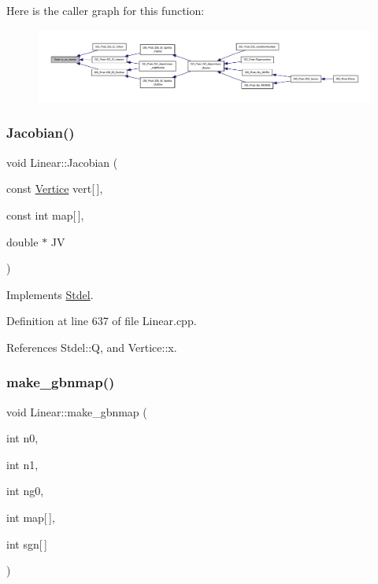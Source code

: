Here is the caller graph for this function\+:
\nopagebreak
\begin{figure}[H]
\begin{center}
\leavevmode
\includegraphics[width=350pt]{classStdel_abb022f0ad81707e11e3a3091d2d87c46_icgraph}
\end{center}
\end{figure}
\mbox{\label{classLinear_ab1e68626dc6eaf9cbd6432e7adcb3721}} 
\subsubsection{\texorpdfstring{Jacobian()}{Jacobian()}}
{\footnotesize\ttfamily void Linear\+::\+Jacobian (\begin{DoxyParamCaption}\item[{const \hyperlink{structVertice}{Vertice}}]{vert\mbox{[}$\,$\mbox{]},  }\item[{const int}]{map\mbox{[}$\,$\mbox{]},  }\item[{double $\ast$}]{JV }\end{DoxyParamCaption})\hspace{0.3cm}{\ttfamily [virtual]}}



Implements \hyperlink{classStdel_a953ff994c1bb423245aff079932c648f}{Stdel}.



Definition at line 637 of file Linear.\+cpp.



References Stdel\+::Q, and Vertice\+::x.

\mbox{\label{classLinear_a3c6456171425bb669ccfb535ae99f11b}} 
\subsubsection{\texorpdfstring{make\+\_\+gbnmap()}{make\_gbnmap()}}
{\footnotesize\ttfamily void Linear\+::make\+\_\+gbnmap (\begin{DoxyParamCaption}\item[{int}]{n0,  }\item[{int}]{n1,  }\item[{int}]{ng0,  }\item[{int}]{map\mbox{[}$\,$\mbox{]},  }\item[{int}]{sgn\mbox{[}$\,$\mbox{]} }\end{DoxyParamCaption})}

